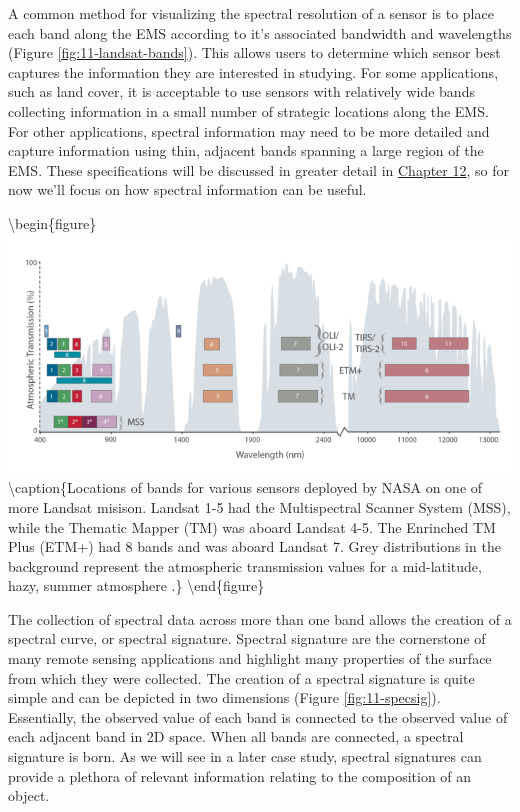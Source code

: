 \documentclass[
]{book}
\begin{document}
A common method for visualizing the spectral resolution of a sensor is
to place each band along the EMS according to it's associated bandwidth
and wavelengths (Figure \ref{fig:11-landsat-bands}). This allows users
to determine which sensor best captures the information they are
interested in studying. For some applications, such as land cover, it is
acceptable to use sensors with relatively wide bands collecting
information in a small number of strategic locations along the EMS. For
other applications, spectral information may need to be more detailed
and capture information using thin, adjacent bands spanning a large
region of the EMS. These specifications will be discussed in greater
detail in \href{https://ubc-geomatics-textbook.github.io/geomatics-textbook/remote-sensing-systems.html}{Chapter 12}, so for now we'll focus on how spectral information
can be useful.

\textbackslash begin\{figure\}
\includegraphics[width=1\linewidth]{images/11-landsat-bands} \textbackslash caption\{Locations of bands for various sensors deployed by NASA on one of more Landsat misison. Landsat 1-5 had the Multispectral Scanner System (MSS), while the Thematic Mapper (TM) was aboard Landsat 4-5. The Enrinched TM Plus (ETM+) had 8 bands and was aboard Landsat 7. Grey distributions in the background represent the atmospheric transmission values for a mid-latitude, hazy, summer atmosphere \citep{nasa_atmospheric_nodate}.\}\label{fig:11-landsat-bands}
\textbackslash end\{figure\}

The collection of spectral data across more than one band allows the
creation of a spectral curve, or spectral signature. Spectral signature
are the cornerstone of many remote sensing applications and highlight
many properties of the surface from which they were collected. The
creation of a spectral signature is quite simple and can be depicted in
two dimensions (Figure \ref{fig:11-specsig}). Essentially, the observed
value of each band is connected to the observed value of each adjacent
band in 2D space. When all bands are connected, a spectral signature is
born. As we will see in a later case study, spectral signatures can
provide a plethora of relevant information relating to the composition
of an object.
\end{document}
